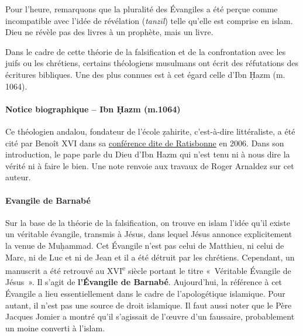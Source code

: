 Pour l'heure, remarquons que la pluralité des Évangiles a été perçue
comme incompatible avec l'idée de révélation (\emph{tanzīl}) telle
qu'elle est comprise en islam. Dieu ne révèle pas des livres à un
prophète, mais un livre.

Dans le cadre de cette théorie de la falsification et de la
confrontation avec les juifs ou les chrétiens, certains théologiens
musulmans ont écrit des réfutations des écritures bibliques. Une des
plus connues est à cet égard celle d'Ibn Ḥazm (m. 1064). \label{Theol:IbnHazm2}

\paragraph{Notice biographique -- Ibn Ḥazm (m.1064)}

Ce théologien andalou, fondateur de l'école ẓahirite, c'est-à-dire
littéraliste, a été cité par Benoît XVI dans sa
\href{http://w2.vatican.va/content/benedict-xvi/fr/speeches/2006/september/documents/hf\_ben-xvi\_spe_20060912\_university-regensburg.html}{conférence
dite de Ratisbonne} en 2006. Dans son introduction, le pape parle du
Dieu d'Ibn Hazm qui n'est tenu ni à nous dire la vérité ni à faire le
bien. Une note renvoie aux travaux de Roger Arnaldez sur cet auteur.


\paragraph{Evangile de Barnabé}
Sur la base de la théorie de la falsification, on trouve en islam l'idée
qu'il existe un véritable évangile, transmis à Jésus, dans lequel Jésus
annonce explicitement la venue de Muḥammad. Cet Évangile n'est pas celui
de Matthieu, ni celui de Marc, ni de Luc et ni de Jean et il a été
détruit par les chrétiens. Cependant, un manuscrit a été retrouvé au
XVI\textsuperscript{e} siècle portant le titre «~Véritable Évangile de
Jésus~». Il s'agit de \textbf{l'Évangile de Barnabé}. Aujourd'hui, la
référence à cet Évangile a lieu essentiellement dans le cadre de
l'apologétique islamique. Pour autant, il n'est pas une source de droit
islamique. Il faut aussi noter que le Père Jacques Jomier a montré qu'il
s'agissait de l'œuvre d'un faussaire, probablement un moine converti à
l'islam.

